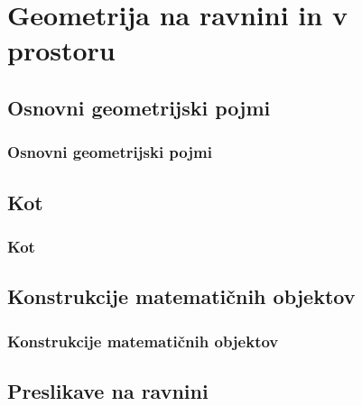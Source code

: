 \section{Geometrija na ravnini in v prostoru}

\begin{frame}
    \sectionpage
\end{frame}

\begin{frame}
\end{frame}

    \subsection{Osnovni geometrijski pojmi}

        \begin{frame}
            \frametitle{Osnovni geometrijski pojmi}
        \end{frame}

    \subsection{Kot}

        \begin{frame}
            \frametitle{Kot}
        \end{frame}

    \subsection{Konstrukcije matematičnih objektov}

        \begin{frame}
            \frametitle{Konstrukcije matematičnih objektov}
        \end{frame}

    \subsection{Preslikave na ravnini}


